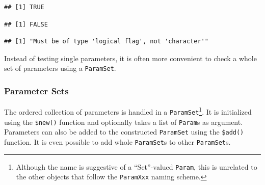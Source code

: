 \documentclass[
]{scrbook}
\newenvironment{Shaded}{\begin{snugshade}}{\end{snugshade}}
\newcommand{\FunctionTok}[1]{\textcolor[rgb]{0.00,0.00,0.00}{#1}}
\newcommand{\NormalTok}[1]{#1}
\newcommand{\OtherTok}[1]{\textcolor[rgb]{0.56,0.35,0.01}{#1}}
\newcommand{\SpecialCharTok}[1]{\textcolor[rgb]{0.00,0.00,0.00}{#1}}
\newcommand{\StringTok}[1]{\textcolor[rgb]{0.31,0.60,0.02}{#1}}
\renewenvironment{Shaded} {\begin{snugshade}\small} {\end{snugshade}}
\begin{document}
\begin{verbatim}
## [1] TRUE
\end{verbatim}

\begin{Shaded}
\end{Shaded}

\begin{verbatim}
## [1] FALSE
\end{verbatim}

\begin{Shaded}
\end{Shaded}

\begin{verbatim}
## [1] "Must be of type 'logical flag', not 'character'"
\end{verbatim}

Instead of testing single parameters, it is often more convenient to check a whole set of parameters using a \texttt{ParamSet}.

\hypertarget{parameter-sets}{%
\subsubsection{Parameter Sets}\label{parameter-sets}}

The ordered collection of parameters is handled in a \texttt{ParamSet}\footnote{Although the name is suggestive of a ``Set''-valued \texttt{Param}, this is unrelated to the other objects that follow the \texttt{ParamXxx} naming scheme.}.
It is initialized using the \texttt{\$new()} function and optionally takes a list of \texttt{Param}s as argument.
Parameters can also be added to the constructed \texttt{ParamSet} using the \texttt{\$add()} function.
It is even possible to add whole \texttt{ParamSet}s to other \texttt{ParamSet}s.

\begin{Shaded}
\end{Shaded}
\end{document}
